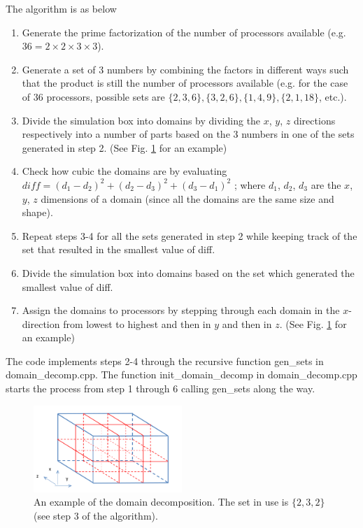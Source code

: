 \documentclass[10pt]{article}
\begin{document}
The algorithm is as below
\begin{enumerate}
\item Generate the prime factorization of the number of processors available (e.g. $36 = 2 \times 2 \times 3 \times 3$).
\item Generate a set of 3 numbers by combining the factors in different ways such that the product
is still the number of processors available (e.g. for the case of 36 processors, possible sets are
$\{2,3,6\}, \{3,2,6\}, \{1,4,9\}, \{2, 1, 18\}$, etc.).
\item Divide the simulation box into domains by dividing the $x$, $y$, $z$ directions respectively into a
number of parts based on the 3 numbers in one of the sets generated in step 2. (See Fig. \ref{fig:ddecomp} for an
example)
\item Check how cubic the domains are by evaluating $diff = (d_1-d_2)^2+(d_2-d_3)^2+(d_3-d_1)^2$ ; where $d_1$, $d_2$, $d_3$
are the $x$, $y$, $z$ dimensions of a domain (since all the domains are the same size and shape).
\item Repeat steps 3-4 for all the sets generated in step 2 while keeping track of the set that resulted
in the smallest value of diff.
\item Divide the simulation box into domains based on the set which generated the smallest value of
diff.
\item Assign the domains to processors by stepping through each domain in the $x$-direction from
lowest to highest and then in $y$ and then in $z$. (See Fig. \ref{fig:ddecomp} for an example)
\end{enumerate}

The code implements steps 2-4 through the recursive function gen\_sets in domain\_decomp.cpp.
The function init\_domain\_decomp in domain\_decomp.cpp starts the process from step 1 through 6
calling gen\_sets along the way.

\begin{figure}[htb]
\includegraphics[width=0.5\textwidth]{ddecomp.jpg}
\caption{An example of the domain decomposition. The set in use is $\{2,3,2\}$ (see step 3 of the algorithm).}
\label{fig:ddecomp}
\end{figure}
\end{document}
